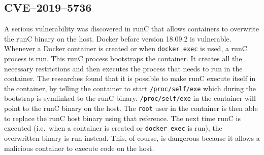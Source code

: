 \subsection{CVE--2019--5736}\label{CVE-2019-5736}
A serious vulnerability was discovered in runC that allows containers to overwrite the runC binary on the host. Docker before version 18.09.2 is vulnerable. Whenever a Docker container is created or when \lstinline{docker exec} is used, a runC process is run. This runC process bootstraps the container. It creates all the necessary restrictions and then executes the process that needs to run in the container. The researches found that it is possible to make runC execute itself in the container, by telling the container to start \lstinline{/proc/self/exe} which during the bootstrap is symlinked to the runC binary\cite{CVE-2019-5736-DragonSector}\cite{CVE-2019-5736-Github}. \lstinline{/proc/self/exe} in the container will point to the runC binary on the host. The \lstinline{root} user in the container is then able to replace the runC host binary using that reference. The next time runC is executed (i.e.\ when a container is created or \lstinline{docker exec} is run), the overwritten binary is run instead. This, of course, is dangerous because it allows a malicious container to execute code on the host.
